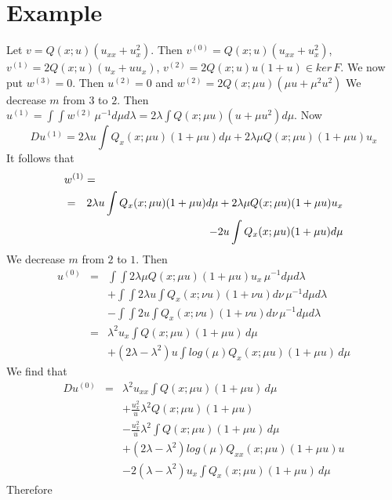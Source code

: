 \section{Example}
Let \( v=Q(x;u)(u_{xx}+u_x^2)\).
Then \(v^{(0)}=Q(x;u)(u_{xx}+u_x^2)\), \( v^{(1)}=2Q(x;u)(u_x+u u_x)\),
\(v^{(2)}=2Q(x;u)u(1+u)\in ker\,F\).
We now put \(w^{(3)}=0\).
Then \(u^{(2)}=0\) and \(w^{(2)}=2 Q(x;\mu u)(\mu u +\mu^2 u^2) \)
We decrease \(m\) from \(3\) to \(2\).
Then \(u^{(1)}= \int \int w^{(2)}\, \mu^{-1}d\mu d\lambda =
2  \lambda \int Q(x;\mu u)(u +\mu u^2) d\mu \).
Now \[
Du^{(1)}=
2 \lambda u \int Q_x(x;\mu u)(1 +\mu u) d\mu
+ 2  \lambda \mu Q(x;\mu u)(1 +\mu u)u_x
\]
It follows that\begin{eqnarray}
\lefteqn{w^{(1)}=}\nonumber\\
&=&2 \lambda u \int Q_x(x;\mu u)(1 +\mu u) d\mu
+ 2  \lambda \mu Q(x;\mu u)(1 +\mu u)u_x\nonumber\\
&&- 2 u \int Q_x(x;\mu u)(1 +\mu u) d\mu \nonumber
\end{eqnarray}
We decrease \(m\) from \(2\) to \(1\).
Then
\begin{eqnarray}
u^{(0)}&=&\int \int 2 \lambda \mu
Q(x;\mu u) (1 +\mu u)u_x \, \mu^{-1}d\mu d\lambda
\nonumber\\
&&+
\int \int 2 \lambda u \int Q_x(x;\nu u)(1 +\nu u) d\nu
\, \mu^{-1}d\mu d\lambda\nonumber\\
&&- \int \int 2 u \int Q_x(x;\nu u)(1 +\nu u) d\nu
\, \mu^{-1}d\mu d\lambda \nonumber\\
&=&  \lambda^2 u_x\int
Q(x;\mu u) (1 +\mu u) \,d\mu
\nonumber\\
&&+ ( 2 \lambda -\lambda^2) u \int log(\mu)Q_x(x;\mu u)(1 +\mu u)
\, d\mu \nonumber
\end{eqnarray}
We find that
\begin{eqnarray}
Du^{(0)}
&=&  \lambda^2 u_{xx}\int
Q(x;\mu u) (1 +\mu u) \,d\mu
\nonumber\\
&&+ \frac{u_{x}^2}{u} \lambda^2
Q(x;\mu u) (1 +\mu u)
\nonumber\\
&&- \frac{u_{x}^2}{u} \lambda^2
\int Q(x;\mu u) (1 +\mu u) \, d\mu
\nonumber\\
&&+ ( 2 \lambda -\lambda^2) log(\mu)Q_{xx}(x;\mu u)(1 +\mu u) u
\nonumber\\
&&- 2 ( \lambda -\lambda^2) u_x \int Q_x(x;\mu u)(1 +\mu u)\, d\mu
\nonumber
\end{eqnarray}
Therefore
